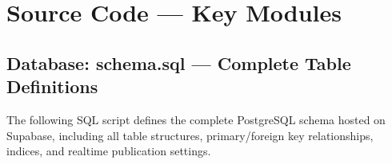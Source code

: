 \clearpage
\appendix

\chapter{Source Code — Key Modules}
\label{app:code}

\section{Database: schema.sql --- Complete Table Definitions}

The following SQL script defines the complete PostgreSQL schema hosted on Supabase, including
all table structures, primary/foreign key relationships, indices, and realtime publication
settings.

